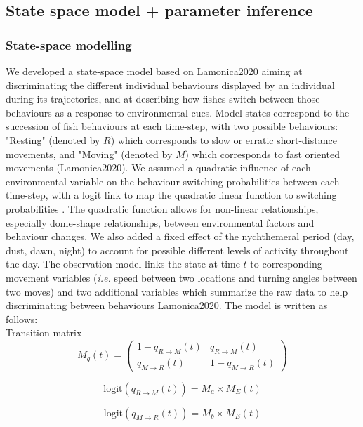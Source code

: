 \documentclass{article}
\begin{document}
\begin{linenumbers}
\subsection{State space model + parameter inference}

\subsubsection{State-space modelling}
We developed a state-space model based on Lamonica2020 aiming at discriminating the different individual behaviours displayed by an individual during its trajectories, and at describing how fishes switch between those behaviours as a response to environmental cues. Model states correspond to the succession of fish behaviours at each time-step, with two possible behaviours: "Resting" (denoted by $R$) which corresponds to slow or erratic short-distance movements, and "Moving" (denoted by $M$) which corresponds to fast oriented movements (Lamonica2020). We assumed a quadratic influence of each environmental variable on the behaviour switching probabilities between each time-step, with a logit link to map the quadratic linear function to switching probabilities %
. The quadratic function allows for non-linear relationships, especially dome-shape relationships, between environmental factors and behaviour changes. We also added a fixed effect of the nychthemeral period (day, dust, dawn, night) to account for possible different levels of activity throughout the day. The observation model links the state at time $t$ to corresponding movement variables (\textit{i.e.} speed between two locations and turning angles between two moves) \cite{Morales2004} and two additional variables which summarize the raw data to help discriminating between behaviours Lamonica2020. 
The model is written as follows:\\
Transition matrix
\begin{equation}
M_{q}(t)=
\begin{pmatrix}
   1-q_{R \rightarrow M}(t) &q_{R \rightarrow M}(t) \\
   q_{M \rightarrow R}(t)&1-q_{M \rightarrow R}(t) 
\end{pmatrix}
\end{equation}


\begin{equation}
\text{logit}(q_{R \rightarrow M}(t)) = M_{a} \times M_{E}(t)
\end{equation}

\begin{equation}
\text{logit}(q_{M \rightarrow R}(t)) = M_{b} \times M_{E}(t)
\end{equation}


\end{linenumbers}
\end{document}
